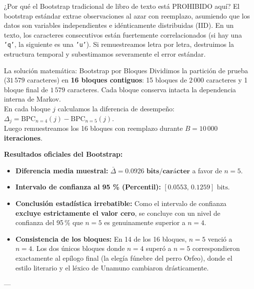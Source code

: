 \documentclass[11pt,letterpaper]{article}
\begin{document}
\begin{alertbox}{¿Por qué el Bootstrap tradicional de libro de texto está PROHIBIDO aquí?}
El bootstrap estándar extrae observaciones al azar con reemplazo, asumiendo que los datos son variables independientes e idénticamente distribuidas (IID). En un texto, los caracteres consecutivos están fuertemente correlacionados (si hay una \texttt{'q'}, la siguiente es una \texttt{'u'}). Si remuestreamos letra por letra, destruimos la estructura temporal y subestimamos severamente el error estándar.
\end{alertbox}

\begin{conceptbox}{La solución matemática: Bootstrap por Bloques}
Dividimos la partición de prueba ($31\,579$ caracteres) en \textbf{16 bloques contiguos}: 15 bloques de $2\,000$ caracteres y 1 bloque final de $1\,579$ caracteres. Cada bloque conserva intacta la dependencia interna de Markov.\\
En cada bloque $j$ calculamos la diferencia de desempeño: $\Delta_j = \text{BPC}_{n=4}(j) - \text{BPC}_{n=5}(j)$.\\
Luego remuestreamos los 16 bloques con reemplazo durante \textbf{$B = 10\,000$ iteraciones}.
\end{conceptbox}

\textbf{Resultados oficiales del Bootstrap:}
\begin{itemize}[leftmargin=*, nosep]
    \item \textbf{Diferencia media muestral:} $\bar{\Delta} = \mathbf{0.0926\text{ bits/carácter}}$ a favor de $n=5$.
    \item \textbf{Intervalo de confianza al 95 \% (Percentil):} $[\mathbf{0.0553},\, \mathbf{0.1259}]\text{ bits}$.
    \item \textbf{Conclusión estadística irrebatible:} Como el intervalo de confianza \textbf{excluye estrictamente el valor cero}, se concluye con un nivel de confianza del 95\,\% que $n=5$ es genuinamente superior a $n=4$.
    \item \textbf{Consistencia de los bloques:} En 14 de los 16 bloques, $n=5$ venció a $n=4$. Los dos únicos bloques donde $n=4$ superó a $n=5$ correspondieron exactamente al epílogo final (la elegía fúnebre del perro Orfeo), donde el estilo literario y el léxico de Unamuno cambiaron drásticamente.
\end{itemize}

---

\end{document}
